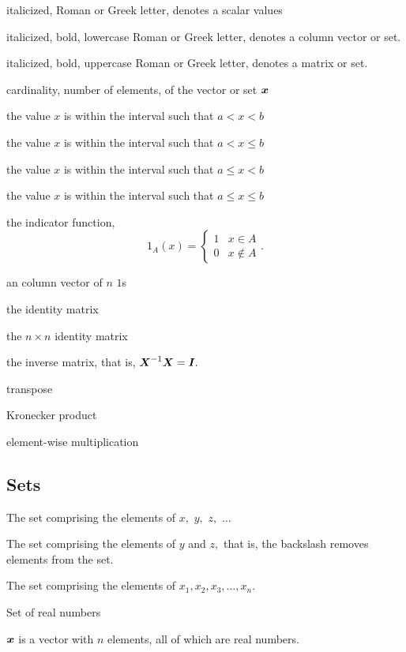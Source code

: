 \documentclass[english,10pt]{ucdenver-dissertation-coadvisors}
\begin{document}
\begin{description}[leftmargin=!, labelwidth=0.7in]
  \item[$x$]             italicized, Roman or Greek letter, denotes a scalar values 
  \item[$\bs{x}$]        italicized, bold, lowercase Roman or Greek letter, denotes a column vector or set.
  \item[$\bs{X}$]        italicized, bold, uppercase Roman or Greek letter, denotes a matrix or set.
  \item[$\card{\bs{x}}$] cardinality, number of elements, of the vector or set $\bs{x}$ 
  \item[$x \in (a, b)$]  the value $x$ is within the interval such that $a < x < b$
  \item[{$x \in (a, b]$}]  the value $x$ is within the interval such that $a < x \leq b$
  \item[$x \in [a, b)$]  the value $x$ is within the interval such that $a \leq x < b$
  \item[{$x \in [a, b]$}]  the value $x$ is within the interval such that $a \leq x \leq b$ 
  \item[$1_{A}\left(x\right)$] the indicator function,\[1_{A}\left(x \right) = \begin{cases} 1 & x \in A \\ 0 & x \notin A \end{cases}.\] 
  \item[$\bs{1}_n$] an column vector of $n$ $1$s
  \item[$\bs{I}$] the identity matrix
  \item[$\bs{I}_n$] the $n \times n$ identity matrix
  \item[$\bs{X}^{-1}$] the inverse matrix, that is, $\boldsymbol{X}^{-1} \boldsymbol{X} = \boldsymbol{I}.$
  \item[$\bs{X}^{T}$] transpose
  \item[$\otimes$] Kronecker product
  \item[$\odot$] element-wise multiplication
\end{description}

\subsection{Sets}

\begin{description}[leftmargin=!, labelwidth=0.8in]
  \item[$\{x, y, z, \ldots\}$]  The set comprising the elements of $x,$ $y,$ $z,$ $\ldots$ 
  \item[$\{x, y, z\} \backslash x$]  The set comprising the elements of $y$ and $z,$ that is, the backslash removes elements from the set.
  \item[$\left\{x_i\right\}_{i = 1}^{n}$]  The set comprising the elements of $x_1, x_2, x_3, \ldots, x_n.$ 
  \item[$\mathbb{R}$] Set of real numbers 
  \item[$\bs{x} \in \mathbb{R}^n$] $\bs{x}$ is a vector with $n$ elements, all of which are real numbers.
\end{description}
\end{document}
